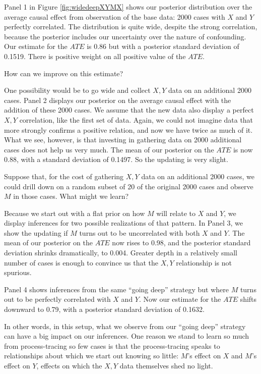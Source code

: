 \documentclass[
  12pt,
]{book}
\begin{document}
Panel 1 in Figure \ref{fig:widedeepXYMX} shows our posterior distribution over the average causal effect from observation of the base data: 2000 cases with \(X\) and \(Y\) perfectly correlated. The distribution is quite wide, despite the strong correlation, because the posterior includes our uncertainty over the nature of confounding. Our estimate for the \(ATE\) is 0.86 but with a posterior standard deviation of 0.1519. There is positive weight on all positive value of the \(ATE\).

How can we improve on this estimate?

One possibility would be to go wide and collect \(X,Y\) data on an additional 2000 cases. Panel 2 displays our posterior on the average causal effect with the addition of these 2000 cases. We assume that the new data also display a perfect \(X,Y\) correlation, like the first set of data. Again, we could not imagine data that more strongly confirms a positive relation, and now we have twice as much of it. What we see, however, is that investing in gathering data on 2000 additional cases does not help us very much. The mean of our posterior on the \(ATE\) is now 0.88, with a standard deviation of 0.1497. So the updating is very slight.

Suppose that, for the cost of gathering \(X,Y\) data on an additional 2000 cases, we could drill down on a random subset of 20 of the original 2000 cases and observe \(M\) in those cases. What might we learn?

Because we start out with a flat prior on how \(M\) will relate to \(X\) and \(Y\), we display inferences for two possible realizations of that pattern. In Panel 3, we show the updating if \(M\) turns out to be uncorrelated with both \(X\) and \(Y\). The mean of our posterior on the \(ATE\) now rises to 0.98, and the posterior standard deviation shrinks dramatically, to 0.004. Greater depth in a relatively small number of cases is enough to convince us that the \(X,Y\) relationship is not spurious.

Panel 4 shows inferences from the same ``going deep'' strategy but where \(M\) turns out to be perfectly correlated with \(X\) and \(Y\). Now our estimate for the \(ATE\) shifts downward to 0.79, with a posterior standard deviation of 0.1632.

In other words, in this setup, what we observe from our ``going deep'' strategy can have a big impact on our inferences. One reason we stand to learn so much from process-tracing so few cases is that the process-tracing speaks to relationships about which we start out knowing so little: \(M\)'s effect on \(X\) and \(M\)'s effect on \(Y\), effects on which the \(X,Y\) data themselves shed no light.
\end{document}
